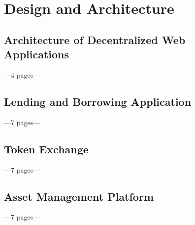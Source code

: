 \chapter{Design and Architecture}
\label{cha:DesignArchitecture}

\section{Architecture of Decentralized Web Applications}
---4 pages---

\section{Lending and Borrowing Application}
---7 pages---

\section{Token Exchange}
---7 pages---

\section{Asset Management Platform}
---7 pages---